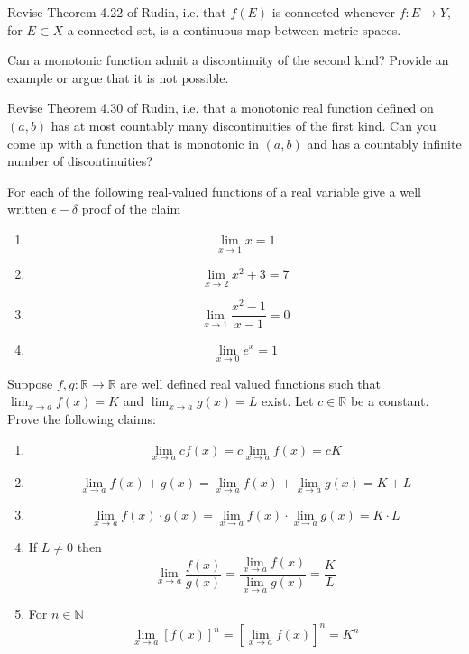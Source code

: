 \documentclass[11pt]{article}%
\begin{document}
\begin{Exercise}[title=**]
	Revise Theorem 4.22 of Rudin, i.e. that $f(E)$ is connected whenever $f:E\to Y$, for $E\subset X$ a connected set, is a continuous map between metric spaces.
\end{Exercise}

\begin{Exercise}[title=*]
	Can a monotonic function admit a discontinuity of the second kind? Provide an example or argue that it is not possible.
\end{Exercise}

\begin{Exercise}[title=**]
	Revise Theorem 4.30 of Rudin, i.e. that a monotonic real function defined on $(a,b)$ has at most countably many discontinuities of the first kind. Can you come up with a function that is monotonic in $(a,b)$ and has a countably infinite number of discontinuities?
\end{Exercise}

\begin{Exercise}[title=**$\dagger$]
For each of the following real-valued functions of a real variable give a well written $\epsilon-\delta$ proof of the claim
\begin{enumerate}
	\item $$\lim_{x\rightarrow 1} x = 1$$
	\item $$\lim_{x\rightarrow 2} x^2+3 = 7$$
	\item $$\lim_{x\rightarrow 1} \frac{x^2-1}{x-1} = 0$$
	\item $$\lim_{x\rightarrow 0} e^x = 1$$
\end{enumerate}

\end{Exercise}

\begin{Exercise}[title=***$\dagger$]
Suppose $f,g:\mathbb R \rightarrow \mathbb R $ are well defined real valued functions such that $\lim_{x\rightarrow a} f(x) =K$ and $\lim_{x\rightarrow a} g(x) = L$ exist. Let $c\in\mathbb R$ be a constant. Prove the following claims: 
\begin{enumerate}
	\item $$\lim_{x\rightarrow a} cf(x) = c \lim_{x\rightarrow a} f(x) = cK$$
	\item $$\lim_{x\rightarrow a} f(x) + g(x) = \lim_{x \rightarrow a} f(x) + \lim_{x \rightarrow a} g(x) = K+L$$
	\item $$\lim_{x\rightarrow a} f(x) \cdot g(x) = \lim_{x \rightarrow a} f(x) \cdot \lim_{x \rightarrow a} g(x) = K\cdot L$$
	\item If $L\neq0$ then
	$$\lim_{x\rightarrow a} \frac{f(x)}{g(x)} = \frac{\lim_{x \rightarrow a} f(x) }{ \lim_{x \rightarrow a} g(x)} = \frac{K}{L}$$
	\item For $n\in\mathbb{N}$ $$\lim_{x\rightarrow a} [f(x)]^n = [\lim_{x\rightarrow a} f(x)]^n=K^n$$
\end{enumerate}
\end{Exercise}
\end{document}
